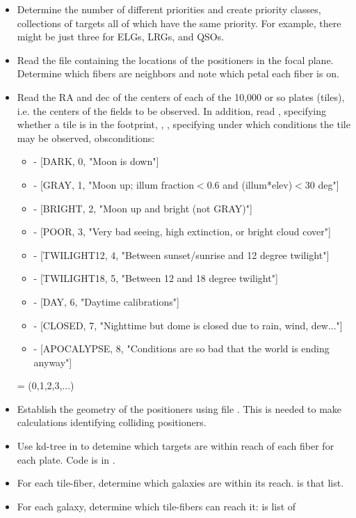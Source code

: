 \documentclass[12pt]{article}
\begin{document}
\begin{itemize}
\item Determine the number of different priorities and create priority classes, collections of targets all of which have the same priority.  For example, there might be just three for ELGs, LRGs, and QSOs.  
\item Read the file containing the locations of the positioners in the focal plane.  Determine which fibers are neighbors and note which petal each fiber is on. 
\item Read the RA and dec of the centers of each of the 10,000 or so plates (tiles), i.e. the centers of the fields to be observed.  In addition, read , specifying whether a tile is in the footprint, , , specifying under which conditions the tile may be observed,
obsconditions:
\begin{itemize}
   \item  - [DARK,        0, "Moon is down"]
    \item - [GRAY,        1, "Moon up; illum fraction$<0.6$ and (illum*elev)$<30$ deg"]
    \item - [BRIGHT,      2, "Moon up and bright (not GRAY)"]
    \item - [POOR,        3, "Very bad seeing, high extinction, or bright cloud cover"]
    \item - [TWILIGHT12,  4, "Between sunset/sunrise and 12 degree twilight"]
    \item - [TWILIGHT18,  5, "Between 12 and 18 degree twilight"]
    \item- [DAY,         6, "Daytime calibrations"]
    \item- [CLOSED,      7, "Nighttime but dome is closed due to rain, wind, dew..."]
    \item- [APOCALYPSE,  8, "Conditions are so bad that the world is ending anyway"]    
\end{itemize}
  = (0,1,2,3,...)
\item Establish the geometry of the positioners using file .  This is needed to make calculations identifying colliding positioners.
\item Use kd-tree in  to detemine which targets are within reach of each fiber for each plate. Code is in .
\item For each tile-fiber, determine which galaxies are within its reach.  is that list.
\item For each galaxy, determine which tile-fibers can reach it:  is list of

\end{itemize}
\end{document}
